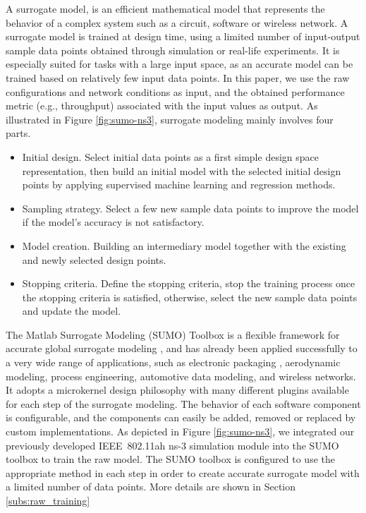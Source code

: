  A surrogate model, is an efficient mathematical model that represents the behavior of a complex system such as a circuit, software or wireless network. A surrogate model is trained at design time, using a limited number of input-output sample data points obtained through simulation or real-life experiments. It is especially suited for tasks with a large input space, as an accurate model can be trained based on relatively few input data points. In this paper, we use the \gls{raw} configurations and network conditions as input, and the obtained performance metric (e.g., throughput) 
associated with the input values as output.
As illustrated in Figure \ref{fig:sumo-ns3},  surrogate modeling mainly involves four parts.
 \begin{itemize}
 \item  Initial design. Select initial data points as a first simple design space representation, then build an initial model with the selected initial design points by applying supervised machine learning and regression methods. 
 \item  Sampling strategy. Select a few new sample data points to improve the model if the model's accuracy is not satisfactory.  \item  Model creation. Building an intermediary model together with the existing and newly selected design points. 
 \item  Stopping criteria. Define the stopping criteria, stop the training process once the stopping criteria is satisfied, otherwise, select the new sample data points and update the model. 
 \end{itemize}
  
 The Matlab Surrogate Modeling (SUMO) Toolbox is a flexible framework for accurate global surrogate modeling \cite{SUMOtoolbox2010}, and has already been applied successfully to a very wide range of applications, such as electronic packaging , aerodynamic modeling, process engineering, automotive data modeling, and wireless networks.
 It adopts a microkernel design philosophy with many different plugins available for each step of the surrogate modeling. The behavior of each software component is configurable, and the components can easily be added, removed or replaced by custom implementations. As depicted in Figure \ref{fig:sumo-ns3}, we integrated our previously developed IEEE~802.11ah ns-3 simulation module \cite{WNS32018} into the SUMO toolbox to train the \gls{raw} model. The SUMO toolbox is configured to use the appropriate method in each step in order to create  accurate surrogate model with a limited number of data points. More details are  shown in Section \ref{subs:raw_training}
 


